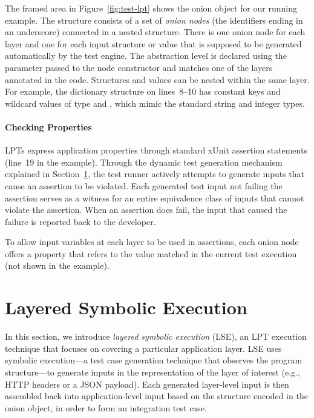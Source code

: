 The framed area in Figure~\ref{fig:test-lpt} shows the onion object for our running example.  The structure consists of a set of \emph{onion nodes} (the identifiers ending in an underscore) connected in a nested structure.  There is one onion node for each layer and one for each input structure or value that is supposed to be generated automatically by the test engine.  The abstraction level is declared using the  parameter passed to the node constructor and matches one of the layers annotated in the code.  Structures and values can be nested within the same layer.  For example, the dictionary structure on lines~8--10 has constant keys and wildcard values of type  and , which mimic the standard string and integer types.

\paragraph{Checking Properties}

LPTs express application properties through standard xUnit assertion statements (line~19 in the example).  Through the dynamic test generation mechanism explained in Section~\ref{sec:paas:layeredsymbex}, the test runner actively attempts to generate inputs that cause an assertion to be violated. Each generated test input not failing the assertion serves as a witness for an entire equivalence class of inputs that cannot violate the assertion.
%
When an assertion does fail, the input that caused the failure is reported back to the developer.

To allow input variables at each layer to be used in assertions, each onion node offers a  property that refers to the value matched in the current test execution (not shown in the example).



\section{Layered Symbolic Execution}
\label{sec:paas:layeredsymbex}

In this section, we introduce \emph{layered symbolic execution} (LSE), an LPT execution technique that focuses on covering a particular application layer.  LSE uses symbolic execution---a test case generation technique that observes the program structure---to generate inputs in the representation of the layer of interest (e.g., HTTP headers or a JSON payload).  Each generated layer-level input is then assembled back into application-level input based on the structure encoded in the onion object, in order to form an integration test case.

